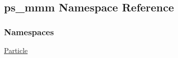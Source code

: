 \hypertarget{namespaceps__mmm}{}\subsection{ps\+\_\+mmm Namespace Reference}
\label{namespaceps__mmm}
\subsubsection*{Namespaces}
\begin{DoxyCompactItemize}
\item 
 \hyperlink{namespaceps__mmm_1_1_particle}{Particle}
\end{DoxyCompactItemize}
